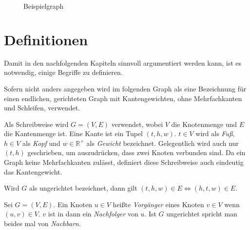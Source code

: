 \begin{figure}[ht]
    \caption{Beispielgraph}
    \label{graphs:fig:beispielgraph}
\end{figure}

\section{Definitionen}
Damit in den nachfolgenden Kapiteln sinnvoll argumentiert werden kann, ist es notwendig, einige Begriffe zu definieren.

\begin{definition}[Graph]
    Sofern nicht anders angegeben wird im folgenden Graph als eine Bezeichnung für einen endlichen, gerichteten Graph mit Kantengewichten, ohne Mehrfachkanten und Schleifen, verwendet.

    Als Schreibweise wird $G = (V, E)$ verwendet, wobei $V$ die Knotenmenge und $E$ die Kantenmenge ist. Eine Kante ist ein Tupel $(t, h, w)$. $t \in V$ wird als \emph{Fuß}, $h \in V$ als \emph{Kopf} und $w \in \mathbb{R}^+$ als \emph{Gewicht} bezeichnet. Gelegentlich wird auch nur $(t, h)$ geschrieben, um auszudrücken, dass zwei Knoten verbunden sind. Da ein Graph keine Mehrfachkanten zulässt, definiert diese Schreibweise auch eindeutig das Kantengewicht.

    Wird $G$ als ungerichtet bezeichnet, dann gilt $(t, h, w) \in E \Leftrightarrow (h, t, w) \in E$.
\end{definition}

\begin{definition}[Nachbar]
    Sei $G = (V, E)$. Ein Knoten $u \in V$ heißte \emph{Vorgänger} eines Knoten $v \in V$ wenn $(u, v) \in V$. $v$ ist in dann ein \emph{Nachfolger} von $u$. Ist $G$ ungerichtet spricht man beides mal von \emph{Nachbarn}.
\end{definition}

